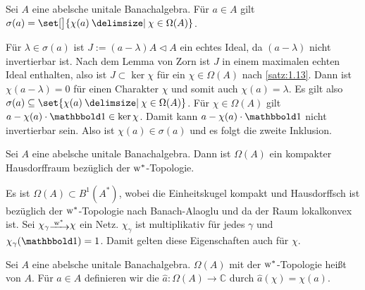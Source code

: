 \begin{satz}[label=satz:1.14,{name=[Spektrum entspricht Menge der $\chi(a)$]}]
	Sei $A$ eine abelsche unitale Banachalgebra. Für $a \in A$ gilt $\sigma(a)=\set[\big]{\chi(a) \given \chi \in \Omega(A)}$.
\end{satz}
\begin{beweis}
	Für $\lambda \in \sigma(a)$ ist $J := (a -\lambda)A \lhd A$ ein echtes Ideal, da $(a-\lambda)$ nicht invertierbar ist. 
	Nach dem Lemma von Zorn ist $J$ in einem maximalen echten Ideal enthalten, also ist $J \subset \ker \chi$ für ein $\chi \in \Omega(A)$ nach \autoref{satz:1.13}. 
	Dann ist $\chi(a- \lambda)=0$ für einen Charakter $\chi$ und somit auch $\chi(a)=\lambda$. 
	Es gilt also $\sigma(a) \subseteq \set{\chi(a) \given \chi \in \Omega(A)}$.	
	Für $\chi \in \Omega(A)$ gilt $a- \chi(a) \cdot \ind \in \ker \chi$. Damit kann $a- \chi(a) \cdot \ind$ nicht invertierbar sein. Also ist $\chi(a) \in \sigma(a)$ und es folgt 
	die zweite Inklusion.
\end{beweis}

\begin{satz}[label=satz:1.15,{name=[Charakterspektrum ist kompakt]}]
	Sei $A$ eine abelsche unitale Banachalgebra. Dann ist $\Omega(A)$ ein kompakter Hausdorffraum bezüglich der $\mathrm{w}^*$-Topologie.
\end{satz}
\begin{beweis}
	Es ist $\Omega(A) \subset B^1(A^*)$, wobei die Einheitskugel kompakt und Hausdorffsch ist bezüglich der $\mathrm{w}^*$-Topologie nach Banach-Alaoglu und da der Raum lokalkonvex 
	ist. Sei $\chi_\gamma \raisemath{-2pt}{\grenzw{\raisebox{-4pt}{\scriptsize$\w^*$}}}\chi$ ein Netz. $\chi_\gamma$ ist multiplikativ für jedes $\gamma$ und $\chi_\gamma(\ind)=1$. Damit gelten diese Eigenschaften auch für 
	$\chi$.
\end{beweis}

\begin{definition}[{name=[Charakterspektrum und Gelfandtransformation]}]
	Sei $A$ eine abelsche unitale Banachalgebra. $\Omega(A)$ mit der $\mathrm{w}^*$-Topologie heißt  von $A$. Für $a \in A$ definieren wir
	die  $\widehat{a} \colon \Omega(A) \to \mathbb{C}$ durch $\widehat{a}(\chi)=\chi(a)$. 
\end{definition}

